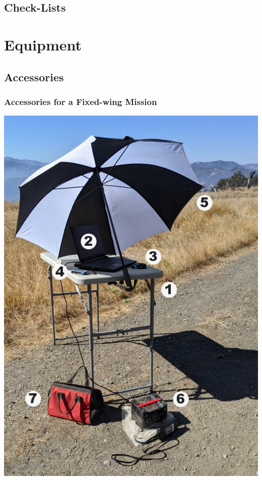 \documentclass[
]{book}
\begin{document}
\hypertarget{check-lists}{%
\section{Check-Lists}\label{check-lists}}

\hypertarget{equipment}{%
\chapter{Equipment}\label{equipment}}

\hypertarget{accessories}{%
\section{Accessories}\label{accessories}}

\hypertarget{accessories-for-a-fixed-wing-mission}{%
\subsection{Accessories for a Fixed-wing Mission}\label{accessories-for-a-fixed-wing-mission}}

\includegraphics{images/accessories-ebee-labels_600x850.jpg}
\end{document}
